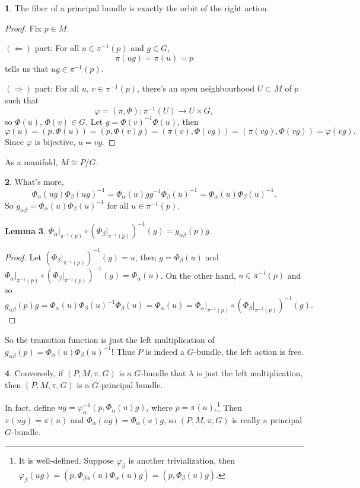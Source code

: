\documentclass[11pt]{article}
\theoremstyle{definition}
\newtheorem{para}{}[part]
\newtheorem{lem}[para]{Lemma}
\begin{document}
\begin{para}
The fiber of a principal bundle is exactly the orbit of the right action.
\end{para}

\begin{proof}
	Fix $p\in M$. 

	$(\Leftarrow)$ part: For all $u\in\pi^{-1}(p)$ and $g\in G$,
	\[
		\pi(ug)=\pi(u)=p
	\]
	tells us that $ug\in \pi^{-1}(p)$. 

	$(\Rightarrow)$ part: For all $u$, $v\in\pi^{-1}(p)$, there's an open neighbourhood $U\subset M$ of $p$ such that
	\[
	\varphi=(\pi,\Phi):\pi^{-1}(U)\to U\times G,
	\]
	so $\Phi(u)$, $\Phi(v)\in G$. Let $g=\Phi(v)^{-1}\Phi(u)$, then
	\[
	\varphi(u)=(p,\Phi(u))=(p,\Phi(v)g)=(\pi(v),\Phi(vg))=(\pi(vg),\Phi(vg))=\varphi(vg).
	\]
	Since $\varphi$ is bijective, $u=vg$.
\end{proof}

As a manifold, $M\cong P/G$.

\begin{para}
What's more,
\[
	\Phi_{\alpha}(ug)\Phi_{\beta}(ug)^{-1}=\Phi_{\alpha}(u)gg^{-1}\Phi_{\beta}(u)^{-1}=\Phi_{\alpha}(u)\Phi_{\beta}(u)^{-1}.
\]
So $g_{\alpha\beta}=\Phi_{\alpha}(u)\Phi_{\beta}(u)^{-1}$ for all $u\in \pi^{-1}(p)$.
\end{para}

\begin{lem}\label{lem:8}
$\Phi_{\alpha}|_{\pi^{-1}(p)}\circ \left(\Phi_{\beta}|_{\pi^{-1}(p)}\right)^{-1}(g)=g_{\alpha\beta}(p)g$.
\end{lem}

\begin{proof}
	Let $\left(\Phi_{\beta}|_{\pi^{-1}(p)}\right)^{-1}(g)=u$, then $g=\Phi_\beta(u)$ and $\Phi_{\alpha}|_{\pi^{-1}(p)}\circ \left(\Phi_{\beta}|_{\pi^{-1}(p)}\right)^{-1}(g)=\Phi_{\alpha}(u)$. On the other hand, $u\in \pi^{-1}(p)$ and so
		\[
		g_{\alpha\beta}(p)g=\Phi_{\alpha}(u)\Phi_{\beta}(u)^{-1}\Phi_\beta(u)=\Phi_{\alpha}(u)=\Phi_{\alpha}|_{\pi^{-1}(p)}\circ \left(\Phi_{\beta}|_{\pi^{-1}(p)}\right)^{-1}(g).
		\]
\end{proof}

So the transition function is just the left multiplication of $g_{\alpha\beta}(p)=\Phi_{\alpha}(u)\Phi_{\beta}(u)^{-1}$! Thus $P$ is indeed a $G$-bundle, the left action is free.

\begin{para}
Conversely, if $(P,M,\pi,G)$ is a $G$-bundle that $\lambda$ is just the left multiplication, then $(P,M,\pi,G)$ is a $G$-principal bundle.

In fact, define $ug=\varphi_{\alpha}^{-1}(p,\Phi_{\alpha}(u)g)$, where $p=\pi(u)$.\footnote{It is well-defined. Suppose $\varphi_\beta$ is another trivialization, then $\varphi_\beta(ug)=(p,\Phi_{\beta\alpha}(u)\Phi_\alpha(u)g)=(p,\Phi_{\beta}(u)g)$.} Then $\pi(ug)=\pi(u)$ and $\Phi_{\alpha}(ug)=\Phi_{\alpha}(u)g$, so $(P,M,\pi,G)$ is really a principal $G$-bundle.
\end{para}
\end{document}
